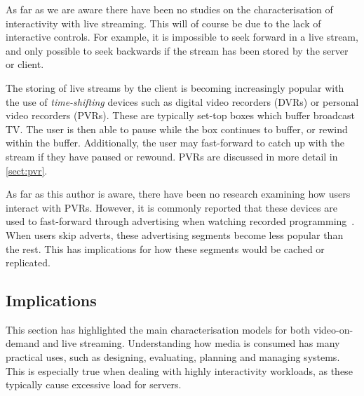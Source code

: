     As far as we are aware there have been no studies on the characterisation of interactivity with live streaming. This will of course be due to the lack of interactive controls. For example, it is impossible to seek forward in a live stream, and only possible to seek backwards if the stream has been stored by the server or client.

    The storing of live streams by the client is becoming increasingly popular with the use of \emph{time-shifting} devices such as digital video recorders (DVRs) or personal video recorders (PVRs). These are typically set-top boxes which buffer broadcast TV. The user is then able to pause while the box continues to buffer, or rewind within the buffer. Additionally, the user may fast-forward to catch up with the stream if they have paused or rewound. PVRs are discussed in more detail in \autoref{sect:pvr}.

    As far as this author is aware, there have been no research examining how users interact with PVRs. However, it is commonly reported that these devices are used to fast-forward through advertising when watching recorded programming~\cite{barwise2005ffp}. When users skip adverts, these advertising segments become less popular than the rest. This has implications for how these segments would be cached or replicated.


\subsection{Implications}




    This section has highlighted the main characterisation models for both video-on-demand and live streaming. Understanding how media is consumed has many practical uses, such as designing, evaluating, planning and managing systems. This is especially true when dealing with highly interactivity workloads, as these typically cause excessive load for servers.

